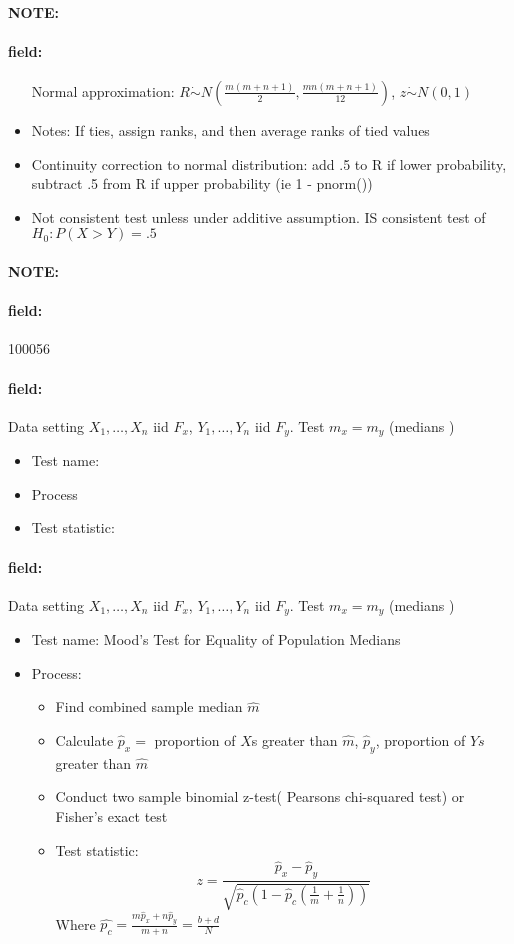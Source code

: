 \documentclass[12pt]{article}
\newenvironment{note}{\paragraph{NOTE:}}{}
\newenvironment{field}{\paragraph{field:}}{}
\begin{document}
\begin{note}
\begin{field}
\begin{itemize}
         Normal approximation: $R \dot\sim N( \frac{m(m+n+1)}{2}, \frac{mn(m+n+1)}{12})$, $z \dot\sim N(0,1)$
   \item Notes: If ties, assign ranks, and then average ranks of tied values
   \item Continuity correction to normal distribution: add .5 to R if lower probability, subtract .5 from R if upper probability (ie 1 - pnorm())
   \item Not consistent test unless under additive assumption. IS consistent test of $H_0: P(X > Y) = .5$
  \end{itemize}
 \end{field}
\end{note}

\begin{note} \begin{field} \tiny 100056 \end{field}
 \begin{field}
  Data setting $X_1, \ldots , X_n$ iid $F_x$, $Y_1, \ldots, Y_n$ iid $F_y$. Test $m_x = m_y$ (medians )
  \begin{itemize}
   \item Test name:
   \item Process
   \item Test statistic:
  \end{itemize}
 \end{field}
 \begin{field}
  Data setting $X_1, \ldots , X_n$ iid $F_x$, $Y_1, \ldots, Y_n$ iid $F_y$. Test $m_x = m_y$ (medians )
  \begin{itemize}
   \item Test name: Mood's Test for Equality of Population Medians
   \item Process:
         \begin{itemize}
          \item Find combined sample median $\hat{m}$
          \item Calculate $\hat{p}_x = $ proportion of $X$s greater than $\hat{m}$, $\hat{p}_y$, proportion of $Ys$ greater than $\hat{m}$
          \item Conduct two sample binomial z-test( Pearsons chi-squared test) or Fisher's exact test
          \item  Test statistic: $$ z = \frac{\hat{p}_x - \hat{p}_y}{\sqrt{\hat{p}_c(1 - \hat{p}_c(\frac{1}{m} + \frac{1}{n}))}} $$ Where $\hat{p_c} = \frac{m\hat{p}_x + n\hat{p}_y}{m+n} = \frac{b + d}{N}$
         \end{itemize}
  \end{itemize}
 \end{field}
\end{note}
\end{document}
